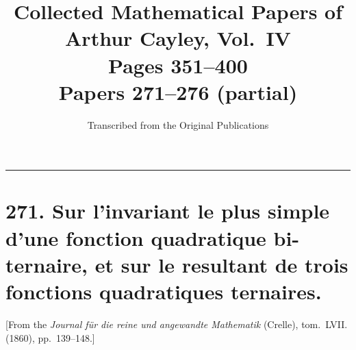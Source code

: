 \documentclass[11pt,a4paper]{article}
\title{\textbf{Collected Mathematical Papers of Arthur Cayley, Vol.~IV}\\[6pt]
\large Pages 351--400\\[4pt]
\normalsize Papers 271--276 (partial)}
\author{Transcribed from the Original Publications}
\date{}
\theoremstyle{definition}
\begin{document}
\maketitle
\thispagestyle{empty}

\vspace{-1em}
\noindent\rule{\textwidth}{0.4pt}

\section*{271. Sur l'invariant le plus simple d'une fonction quadratique bi-ternaire,
et sur le resultant de trois fonctions quadratiques ternaires.}

[From the \textit{Journal f\"{u}r die reine und angewandte Mathematik} (Crelle),
tom.~LVII. (1860), pp.~139--148.]
\vspace{0.5em}
\end{document}

